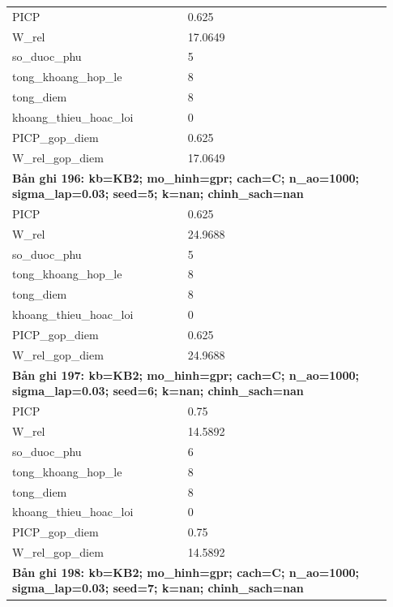 \begin{longtable}{p{0.43\linewidth}p{0.50\linewidth}}
PICP & 0.625 \\
W\_\allowbreak rel & 17.0649 \\
so\_\allowbreak duoc\_\allowbreak phu & 5 \\
tong\_\allowbreak khoang\_\allowbreak hop\_\allowbreak le & 8 \\
tong\_\allowbreak diem & 8 \\
khoang\_\allowbreak thieu\_\allowbreak hoac\_\allowbreak loi & 0 \\
PICP\_\allowbreak gop\_\allowbreak diem & 0.625 \\
W\_\allowbreak rel\_\allowbreak gop\_\allowbreak diem & 17.0649 \\
\midrule
\multicolumn{2}{p{0.95\linewidth}}{\textbf{Bản ghi 196: kb=KB2; mo\_hinh=gpr; cach=C; n\_ao=1000; sigma\_lap=0.03; seed=5; k=nan; chinh\_sach=nan}} \\
PICP & 0.625 \\
W\_\allowbreak rel & 24.9688 \\
so\_\allowbreak duoc\_\allowbreak phu & 5 \\
tong\_\allowbreak khoang\_\allowbreak hop\_\allowbreak le & 8 \\
tong\_\allowbreak diem & 8 \\
khoang\_\allowbreak thieu\_\allowbreak hoac\_\allowbreak loi & 0 \\
PICP\_\allowbreak gop\_\allowbreak diem & 0.625 \\
W\_\allowbreak rel\_\allowbreak gop\_\allowbreak diem & 24.9688 \\
\midrule
\multicolumn{2}{p{0.95\linewidth}}{\textbf{Bản ghi 197: kb=KB2; mo\_hinh=gpr; cach=C; n\_ao=1000; sigma\_lap=0.03; seed=6; k=nan; chinh\_sach=nan}} \\
PICP & 0.75 \\
W\_\allowbreak rel & 14.5892 \\
so\_\allowbreak duoc\_\allowbreak phu & 6 \\
tong\_\allowbreak khoang\_\allowbreak hop\_\allowbreak le & 8 \\
tong\_\allowbreak diem & 8 \\
khoang\_\allowbreak thieu\_\allowbreak hoac\_\allowbreak loi & 0 \\
PICP\_\allowbreak gop\_\allowbreak diem & 0.75 \\
W\_\allowbreak rel\_\allowbreak gop\_\allowbreak diem & 14.5892 \\
\midrule
\multicolumn{2}{p{0.95\linewidth}}{\textbf{Bản ghi 198: kb=KB2; mo\_hinh=gpr; cach=C; n\_ao=1000; sigma\_lap=0.03; seed=7; k=nan; chinh\_sach=nan}} \\

\end{longtable}
